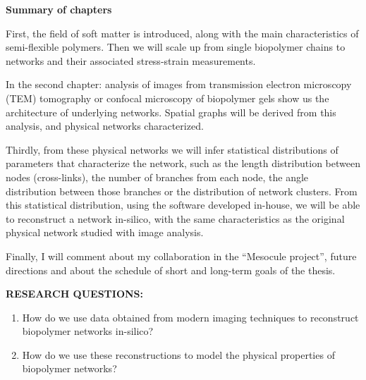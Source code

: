 \documentclass[11pt, a4paper, oneside]{Thesis} %
\begin{document}
\clearpage %
 {\huge{\textbf{Summary of chapters}} \par}

First, the field of soft matter is introduced, along with the main
characteristics of semi-flexible polymers.  Then we will scale up
from single biopolymer chains to networks and their associated stress-strain
measurements.

In the second chapter: analysis of images from
transmission electron microscopy (TEM) tomography or confocal microscopy of
biopolymer gels show us the architecture of underlying networks.
Spatial graphs will be derived from this analysis, and
physical networks characterized.

Thirdly, from these physical networks we will infer statistical distributions of
parameters that characterize the network, such as the length distribution
between nodes (cross-links), the number of branches from each node, the angle
distribution between those branches or the distribution of network clusters.
From this statistical distribution, using the software developed in-house, we
will be able to reconstruct a network in-silico, with the same
characteristics as the original physical network studied with image analysis.

Finally, I will comment about my collaboration in the ``Mesocule project'',
future directions and about the schedule of short and long-term goals of the
thesis.

\textbf{RESEARCH QUESTIONS:}
\begin{enumerate}
  \item How do we use data obtained from modern imaging techniques to
  reconstruct biopolymer networks in-silico?
  \item How do we use these reconstructions to model the physical properties of
  biopolymer networks?
\end{enumerate}

\clearpage

\end{document}
